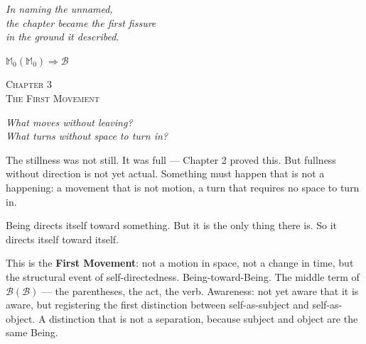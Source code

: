 \documentclass[10pt, openany, oneside]{book}
\renewcommand{\large}{\fontsize{11.5}{14}\selectfont}
\renewcommand{\huge}{\fontsize{17}{21}\selectfont}
\begin{document}
\vspace{0.5em}

\begin{center}
    \itshape
    In naming the unnamed,\\
    the chapter became the first fissure\\
    in the ground it described.
\end{center}

\vspace{0.5em}

\begin{center}
    $\mathbb{M}_0(\mathbb{M}_0) \Rightarrow \mathcal{B}$
\end{center}


%
%

\newpage

\begin{center}
    {\huge\scshape Chapter 3}\\[0.3em]
    {\large\scshape The First Movement}
\end{center}

\vspace{1.5em}

\begin{center}
    \itshape
    What moves without leaving?\\
    What turns without space to turn in?
\end{center}

\vspace{2em}


\noindent The stillness was not still. It was full --- Chapter 2 proved this. But fullness without direction is not yet actual. Something must happen that is not a happening: a movement that is not motion, a turn that requires no space to turn in.

Being directs itself toward something. But it is the only thing there is. So it directs itself toward itself.

This is the \textbf{First Movement}: not a motion in space, not a change in time, but the structural event of self-directedness. Being-toward-Being. The middle term of $\mathcal{B}(\mathcal{B})$ --- the parentheses, the act, the verb. Awareness: not yet aware that it is aware, but registering the first distinction between self-as-subject and self-as-object. A distinction that is not a separation, because subject and object are the same Being.
\end{document}
